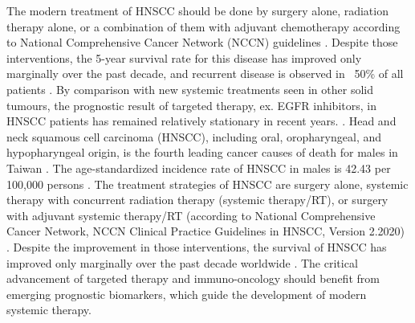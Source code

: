 \documentclass[12pt, a4paper]{article}
\begin{document}
% 
% 




The modern treatment of HNSCC should be done by surgery alone, radiation therapy alone, or a combination of them with adjuvant chemotherapy according to National Comprehensive Cancer Network (NCCN) guidelines \citep{Pfishter2019}. Despite those interventions, the 5-year survival rate for this disease has improved only marginally over the past decade, and recurrent disease is observed in ~50\% of all patients \citep{Forastiere2001,Warnakulasuriya2009}. By comparison with new systemic treatments seen in other solid tumours, the prognostic result of targeted therapy, ex. EGFR inhibitors, in HNSCC patients has remained relatively stationary in recent years. \citep{Argiris2015a}. 
Head and neck squamous cell carcinoma (HNSCC), including oral, oropharyngeal, and hypopharyngeal origin, is the fourth leading cancer causes of death for males in Taiwan \citep{MOHW_death2017}. The age-standardized incidence rate of HNSCC in males is 42.43 per 100,000 persons \citep{MOHW_incidence2018}. 
The treatment strategies of HNSCC are surgery alone, systemic therapy with concurrent radiation therapy (systemic therapy/RT), or surgery with adjuvant systemic therapy/RT (according to National Comprehensive Cancer Network, NCCN Clinical Practice Guidelines in HNSCC, Version 2.2020) \citep{Pfister2020a}. Despite the improvement in those interventions, the survival of HNSCC has improved only marginally over the past decade worldwide \citep{hpa2019}. The critical advancement of targeted therapy and immuno-oncology should benefit from emerging prognostic biomarkers, which guide the development of modern systemic therapy.
\end{document}
